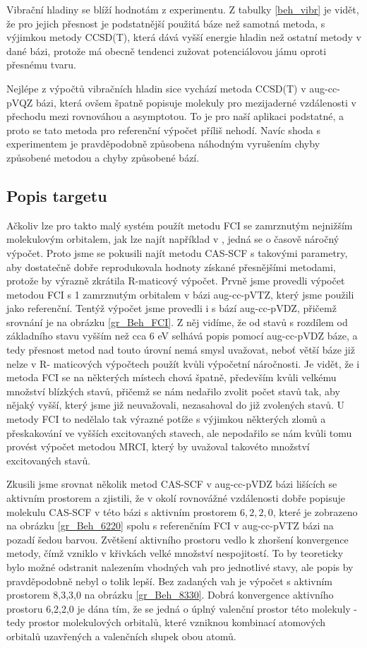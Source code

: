 Vibrační hladiny se blíží hodnotám z experimentu. Z tabulky \ref{beh_vibr} je 
vidět, že pro jejich přesnost je podstatnější použitá báze než samotná metoda, s 
výjimkou metody CCSD(T), která dává vyšší energie hladin než ostatní metody v dané 
bázi, protože má obecně tendenci zužovat potenciálovou jámu oproti přesnému tvaru.

Nejlépe z výpočtů vibračních hladin sice vychází metoda CCSD(T) v aug-cc-pVQZ bázi, která ovšem špatně popisuje
molekuly pro mezijaderné vzdálenosti v přechodu mezi rovnováhou a asymptotou.
To je pro naší aplikaci podstatné, a proto se tato metoda pro referenční výpočet příliš 
nehodí. Navíc shoda s experimentem je pravděpodobně způsobena náhodným vyrušením chyby způsobené metodou a chyby způsobené bází.

\subsection{Popis targetu}
Ačkoliv lze pro takto malý systém použít metodu FCI se zamrznutým nejnižším molekulovým 
orbitalem, jak lze najít například v \cite{BeH-Rmat}, jedná se o časově náročný 
výpočet. Proto jsme se pokusili najít metodu CAS-SCF s takovými parametry, aby 
dostatečně dobře reprodukovala hodnoty získané přesnějšími metodami, protože by výrazně 
zkrátila R-maticový výpočet.
Prvně jsme provedli výpočet metodou FCI s 1 zamrznutým orbitalem v bázi aug-cc-pVTZ, 
který jsme použili jako referenční. Tentýž výpočet jsme provedli i s bází aug-cc-pVDZ, 
přičemž srovnání je na obrázku \ref{gr_Beh_FCI}. Z něj vidíme, že od stavů s rozdílem 
od základního stavu vyšším než cca 6 eV selhává popis pomocí aug-cc-pVDZ báze, a tedy 
přesnost metod nad touto úrovní nemá smysl uvažovat, neboť větší báze již nelze v R-
maticových výpočtech použít kvůli výpočetní náročnosti. Je vidět, že i metoda FCI se na 
některých místech chová špatně, především kvůli velkému množství blízkých stavů, 
přičemž se nám nedařilo zvolit počet stavů tak, aby nějaký vyšší, který jsme již 
neuvažovali, nezasahoval do již zvolených stavů. U metody FCI to nedělalo tak výrazné 
potíže s výjimkou některých zlomů a přeskakování ve vyšších excitovaných stavech, ale  
nepodařilo se nám kvůli tomu provést výpočet metodou MRCI, 
který by uvažoval takovéto množství excitovaných stavů.

Zkusili jsme srovnat několik metod CAS-SCF v aug-cc-pVDZ bázi lišících se aktivním 
prostorem a zjistili, že v okolí rovnovážné vzdálenosti dobře popisuje molekulu CAS-SCF 
v této bázi s 
aktivním prostorem $6,2,2,0$, které je zobrazeno na obrázku \ref{gr_Beh_6220} spolu s 
referenčním FCI v aug-cc-pVTZ bázi na pozadí šedou barvou. Zvětšení aktivního prostoru 
vedlo k zhoršení 
konvergence metody, čímž vzniklo v křivkách velké množství nespojitostí. To by 
teoreticky bylo možné odstranit nalezením vhodných vah pro jednotlivé stavy, ale popis 
by pravděpodobně nebyl o tolik lepší. Bez zadaných vah je výpočet s aktivním prostorem 
8,3,3,0 na obrázku \ref{gr_Beh_8330}.
Dobrá konvergence aktivního prostoru 6,2,2,0 je dána tím, že se jedná o úplný valenční 
prostor této molekuly - tedy prostor molekulových orbitalů, které vzniknou kombinací 
atomových orbitalů uzavřených a valenčních slupek obou atomů.

